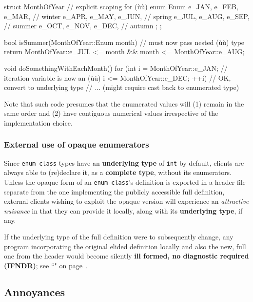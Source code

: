 \begin{emcppslisting}
struct MonthOfYear  // explicit scoping for (ù{}ù)
{
    enum Enum
    {
        e_JAN, e_FEB, e_MAR,  // winter
        e_APR, e_MAY, e_JUN,  // spring
        e_JUL, e_AUG, e_SEP,  // summer
        e_OCT, e_NOV, e_DEC,  // autumn
    };
};

bool isSummer(MonthOfYear::Enum month)  // must now pass nested (ù{}ù) type
{
    return MonthOfYear::e_JUL <= month && month <= MonthOfYear::e_AUG;
}

void doSomethingWithEachMonth()
{
    for (int i =  MonthOfYear::e_JAN;  // iteration variable is now an (ù{}ù)
             i <= MonthOfYear::e_DEC;
           ++i)  // OK, convert to underlying type
    {
        // ... (might require cast back to enumerated type)
    }
}
\end{emcppslisting}

\noindent Note that such code presumes that the enumerated values will (1) remain
in the same order and (2) have contiguous numerical values irrespective
of the implementation choice.

\subsubsection[External use of opaque enumerators]{External use of opaque enumerators}\label{external-use-of-opaque-enumerators-enumclass}

Since \texttt{enum}~\texttt{class} types have an \textbf{underlying
type} of \texttt{int} by default, clients are always able to (re)declare
it, as a \textbf{complete type}, without its enumerators. Unless the
opaque form of an \texttt{enum}~\texttt{class}'s definition is exported
in a header file separate from the one implementing the publicly
accessible full definition, external clients wishing to exploit the
opaque version will experience an \emph{attractive nuisance} in that
they can provide it locally, along with its \textbf{underlying type}, if
any.

If the underlying type of the full definition were to subsequently
change, any program incorporating the original elided definition locally
and also the new, full one from the header would become silently \textbf{ill formed, no diagnostic required (IFNDR)}; see ``" on page~\pageref{enumopaque}.

\subsection[Annoyances]{Annoyances}\label{annoyances-enumclass}

